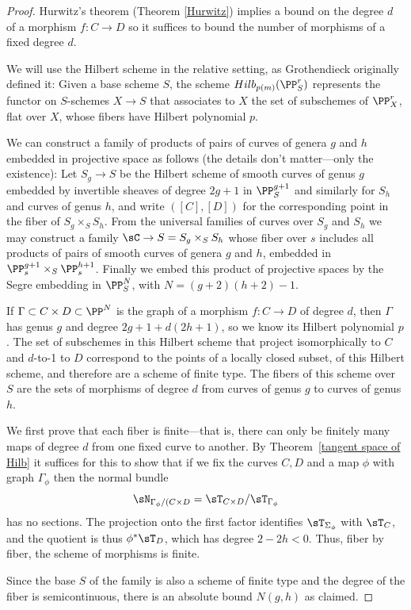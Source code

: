  \begin{proof}
Hurwitz's theorem (Theorem \ref{Hurwitz}) implies a bound on the
degree $d$ of a morphism $f : C \to D$ so it suffices to 
 bound the number of morphisms of a fixed degree $d$.
 
 We will use the Hilbert scheme in the relative setting, as Grothendieck originally defined it: Given a base scheme $S$,
the scheme $Hilb_{p(m)}(\PP_{S}^{r})$ represents the functor on $S$-schemes $X\to S$ that associates to 
$X$ the set of subschemes of $\PP_{X}^{r}$, flat over $X$, whose fibers have Hilbert polynomial $p$.

We can construct a family of products of pairs of curves of genera $g$ and $h$ embedded in projective space as follows
(the details don't matter---only the existence):
Let $S_{g}\to S$ be the Hilbert scheme of smooth curves of genus $g$ embedded by invertible sheaves of degree $2g+1$
in $\PP^{g+1}_{S}$
and similarly for $S_{h}$ and curves of genus $h$, and write $([C],[D])$ for the corresponding point in the fiber
of $S_{g}\times_{S}S_{h}$. From the universal families of curves over $S_{g}$ and
$S_{h}$ we may construct a family $\sC \to S= S_{g}\times_{S} S_{h}$ whose fiber over $s$ includes all products of 
pairs of smooth curves of genera $g$ and $h$, embedded in $\PP_{s}^{g+1}\times_{S}\PP_{s}^{h+1}$. Finally we embed
this product of projective spaces by the Segre embedding in $\PP_{S}^{N}$, with $N = (g+2)(h+2)-1$. 

If $\Gamma \subset C \times D \subset \PP^N$ is the graph of a morphism $f : C \to D$ of degree $d$, then $\Gamma$ has genus $g$ and degree $2g+1 + d(2h+1)$, so we know its Hilbert polynomial $p$. The set of
subschemes in this Hilbert scheme that project isomorphically to $C$ and $d$-to-1 to $D$ correspond to the
points of a  locally closed subset, of this Hilbert scheme, and therefore are a scheme of finite type. The fibers
of this scheme over $S$ are the sets of morphisms of degree $d$ from curves of genus $g$ to curves of genus $h$.

We first prove that each fiber is finite---that is, there can only be finitely many maps of degree $d$ from
one fixed curve to another.  By Theorem~\ref{tangent space of Hilb} it suffices for this to show that if we fix the curves $C,D$ and a map $\phi$
with graph $\Gamma_{\phi}$
then the normal bundle 
$$
\sN_{\Gamma_{\phi}/(C\times D} = \sT_{C\times D}/\sT_{\Gamma_{\phi}}
$$
has no sections. The projection onto the first factor identifies $\sT_{\Sigma_{\phi}}$ with $\sT_{C}$,
and the quotient is thus $\phi^{*} \sT_{D}$, which has degree $2-2h<0$. Thus, fiber by fiber,
the scheme of morphisms is finite. 

Since the base $S$ of the family is also a scheme of finite type and the degree of the fiber is semicontinuous,
there is an absolute bound $N(g,h)$ as claimed.
 \end{proof}

